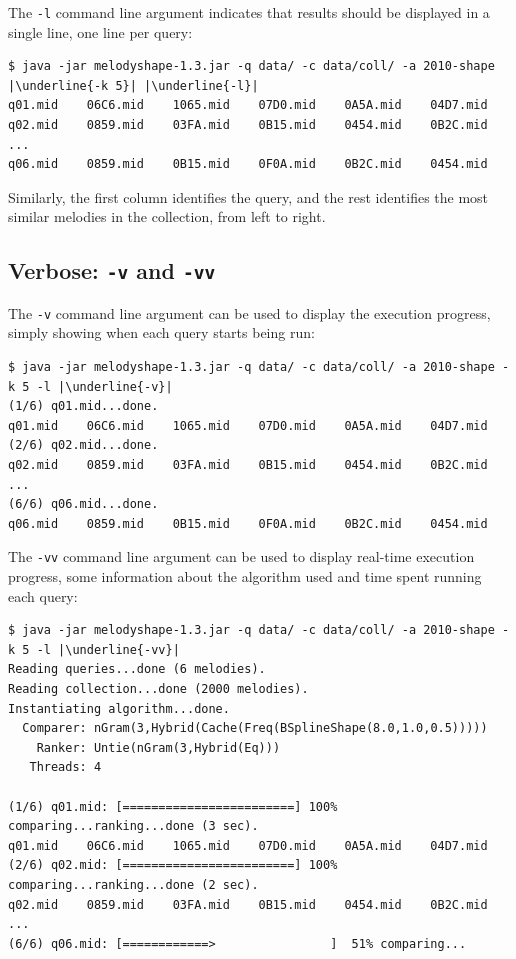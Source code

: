 \documentclass[twoside]{article}
\begin{document}
The \texttt{-l} command line argument indicates that results should be displayed in a single line, one line per query:
\begin{lstlisting}
$ java -jar melodyshape-1.3.jar -q data/ -c data/coll/ -a 2010-shape |\underline{-k 5}| |\underline{-l}|
q01.mid    06C6.mid    1065.mid    07D0.mid    0A5A.mid    04D7.mid
q02.mid    0859.mid    03FA.mid    0B15.mid    0454.mid    0B2C.mid
...
q06.mid    0859.mid    0B15.mid    0F0A.mid    0B2C.mid    0454.mid
\end{lstlisting}

Similarly, the first column identifies the query, and the rest identifies the most similar melodies in the collection, from left to right.

\subsection{Verbose: \texttt{-v} and \texttt{-vv}}

The \texttt{-v} command line argument can be used to display the execution progress, simply showing when each query starts being run:
\begin{lstlisting}
$ java -jar melodyshape-1.3.jar -q data/ -c data/coll/ -a 2010-shape -k 5 -l |\underline{-v}|
(1/6) q01.mid...done.
q01.mid    06C6.mid    1065.mid    07D0.mid    0A5A.mid    04D7.mid
(2/6) q02.mid...done.
q02.mid    0859.mid    03FA.mid    0B15.mid    0454.mid    0B2C.mid
...
(6/6) q06.mid...done.
q06.mid    0859.mid    0B15.mid    0F0A.mid    0B2C.mid    0454.mid
\end{lstlisting}

The \texttt{-vv} command line argument can be used to display real-time execution progress, some information about the algorithm used and time spent running each query:
\begin{lstlisting}
$ java -jar melodyshape-1.3.jar -q data/ -c data/coll/ -a 2010-shape -k 5 -l |\underline{-vv}|
Reading queries...done (6 melodies).
Reading collection...done (2000 melodies).
Instantiating algorithm...done.
  Comparer: nGram(3,Hybrid(Cache(Freq(BSplineShape(8.0,1.0,0.5)))))
    Ranker: Untie(nGram(3,Hybrid(Eq)))
   Threads: 4
 
(1/6) q01.mid: [========================] 100% comparing...ranking...done (3 sec).
q01.mid    06C6.mid    1065.mid    07D0.mid    0A5A.mid    04D7.mid
(2/6) q02.mid: [========================] 100% comparing...ranking...done (2 sec).
q02.mid    0859.mid    03FA.mid    0B15.mid    0454.mid    0B2C.mid
...
(6/6) q06.mid: [============>                ]  51% comparing...
\end{lstlisting}
\end{document}
